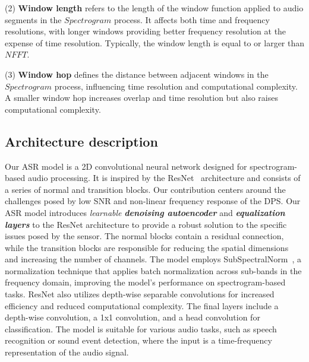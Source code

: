 (2) \textbf{Window length} refers to the length of the window function applied to audio segments in the $Spectrogram$ process. It affects both time and frequency resolutions, with longer windows providing better frequency resolution at the expense of time resolution. Typically, the window length is equal to or larger than $NFFT$.
    
(3) \textbf{Window hop} defines the distance between adjacent windows in the $Spectrogram$ process, influencing time resolution and computational complexity. A smaller window hop increases overlap and time resolution but also raises computational complexity.





\subsection{Architecture description}
Our ASR model is a 2D convolutional neural network designed for spectrogram-based audio processing. It is inspired by the ResNet~\cite{resnet, audioresnet} architecture and consists of a series of normal and transition blocks. 
Our contribution centers around the challenges posed by low SNR and non-linear frequency response of the DPS. Our ASR model introduces \textit{learnable} \textbf{\textit{denoising autoencoder}} and \textbf{\textit{equalization layers}} to the {ResNet} architecture to provide a robust solution to the specific issues posed by the sensor.
The normal blocks contain a residual connection, while the transition blocks are responsible for reducing the spatial dimensions and increasing the number of channels. The model employs SubSpectralNorm~\cite{subspectral}, a normalization technique that applies batch normalization across sub-bands in the frequency domain, improving the model's performance on spectrogram-based tasks. ResNet also utilizes depth-wise separable convolutions for increased efficiency and reduced computational complexity. The final layers include a depth-wise convolution, a 1x1 convolution, and a head convolution for classification. The model is suitable for various audio tasks, such as speech recognition or sound event detection, where the input is a time-frequency representation of the audio signal.

